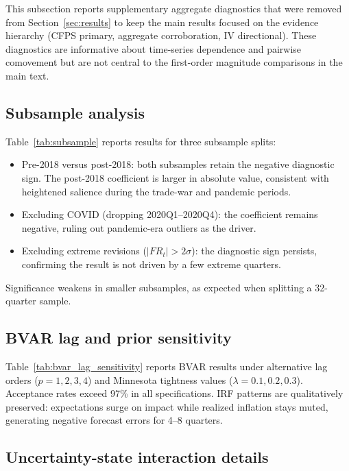 This subsection reports supplementary aggregate diagnostics that were
removed from Section~\ref{sec:results} to keep the main results focused
on the evidence hierarchy (CFPS primary, aggregate corroboration, IV
directional). These diagnostics are informative about time-series
dependence and pairwise comovement but are not central to the first-order
magnitude comparisons in the main text.





\subsection{Subsample analysis}

Table~\ref{tab:subsample} reports results for three
subsample splits:
\begin{itemize}
  \item Pre-2018 versus post-2018: both subsamples
    retain the negative diagnostic sign. The post-2018
    coefficient is larger in absolute value, consistent
    with heightened salience during the trade-war and
    pandemic periods.
  \item Excluding COVID (dropping 2020Q1--2020Q4): the
    coefficient remains negative, ruling out
    pandemic-era outliers as the driver.
  \item Excluding extreme revisions ($|FR_t| > 2\sigma$):
    the diagnostic sign persists, confirming the result
    is not driven by a few extreme quarters.
\end{itemize}
Significance weakens in smaller subsamples, as expected
when splitting a 32-quarter sample.



\subsection{BVAR lag and prior sensitivity}

Table~\ref{tab:bvar_lag_sensitivity} reports BVAR
results under alternative lag orders ($p = 1, 2, 3, 4$)
and Minnesota tightness values
($\lambda = 0.1, 0.2, 0.3$). Acceptance rates exceed
97\% in all specifications. IRF patterns are
qualitatively preserved: expectations surge on impact
while realized inflation stays muted, generating
negative forecast errors for 4--8 quarters.



\subsection{Uncertainty-state interaction details}

